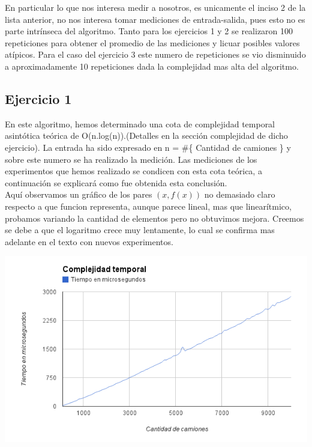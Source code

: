 En particular lo que nos interesa medir a nosotros, es unicamente el inciso 2 de la lista anterior, no nos interesa tomar mediciones de entrada-salida, pues esto no es parte intr\'inseca del algoritmo. Tanto para los ejercicios 1 y 2 se realizaron 100 repeticiones para obtener el promedio de las mediciones y licuar posibles valores at\'ipicos. Para el caso del ejercicio 3 este numero de repeticiones se vio disminuido a aproximadamente 10 repeticiones dada la complejidad mas alta del algoritmo.

\subsection{Ejercicio 1}
En este algoritmo, hemos determinado una cota de complejidad temporal asint\'otica te\'orica de O(n.log(n)).(Detalles en la secci\'on complejidad de dicho ejercicio).
La entrada ha sido expresado en n = \#\{ Cantidad de camiones \} y sobre este numero se ha realizado la medici\'on. Las mediciones de los experimentos que hemos realizado se condicen con esta cota te\'orica, a continuaci\'on se explicar\'a como fue obtenida esta conclusi\'on.\\

Aqu\'i observamos un gr\'afico de los pares $(x, f(x))$ no demasiado claro respecto a que funcion representa, aunque parece lineal, mas que linear\'itmico, probamos variando la cantidad de elementos pero no obtuvimos mejora. Creemos se debe a que el logaritmo crece muy lentamente, lo cual se confirma mas adelante en el texto con nuevos experimentos.  
\begin{center}
	\includegraphics[scale=0.6]{images/ej1_fx.png}
\end{center}

